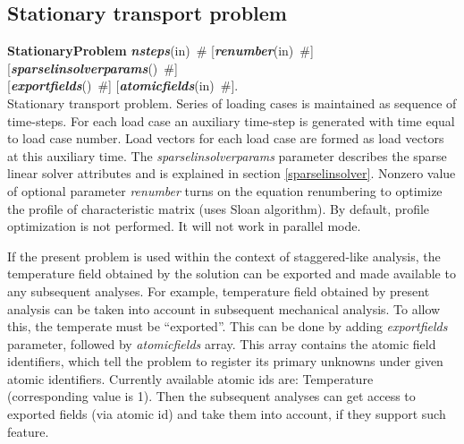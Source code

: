 \documentclass[draft]{article}
\newcommand{\param}[1]{{\em #1}}
\newcommand{\keywordnotype}[1]{\mbox{{\it{\bf{#1}}}}}
\newcommand{\keyword}[2]{\mbox{{\keywordnotype{#1}\tiny (#2)}}}
\newcommand{\entKeywordInst}[1]{\mbox{{\bf{{#1}}}}}
\newcommand{\field}[2]{\mbox{\keyword{#1}{#2}~\#}}
\newcommand{\optField}[2]{\mbox{[\field{#1}{#2}]}}
\begin{document}
\subsection{Stationary transport problem}
\label{StationaryTransport}
\entKeywordInst{StationaryProblem} \field{nsteps}{in} \optField{renumber}{in}
\optField{sparselinsolverparams}{}\\ \optField{exportfields}{}
\optField{atomicfields}{in}.\\
Stationary transport problem. 
Series of loading cases is maintained as sequence of time-steps.
For each load case an auxiliary time-step is generated with time
equal to load case number.
Load vectors for each load case are formed as load vectors at
this auxiliary time.
The  \param{sparselinsolverparams} parameter describes the sparse
linear solver attributes and is explained in section \ref{sparselinsolver}.
Nonzero value of optional parameter \param{renumber} turns on the
equation renumbering to optimize the profile of characteristic matrix
(uses Sloan algorithm). By default, profile optimization is not
performed. It will not work in parallel mode.

If the present problem is used within the context
of staggered-like analysis, the temperature field obtained by the
solution can be exported and made available to any subsequent
analyses. For example, temperature field obtained by present analysis
can be taken into account in subsequent mechanical analysis.
To allow this, the temperate must be ``exported''. This can be done
by adding \param{exportfields} parameter, followed by
\param{atomicfields} array. This array contains the atomic field
identifiers, which tell the problem to register its primary unknowns
under given atomic identifiers. Currently available atomic ids are:
Temperature (corresponding value is 1).
Then the subsequent analyses can get access to exported fields (via
atomic id) and take them into account, if they support such feature.
\end{document}
